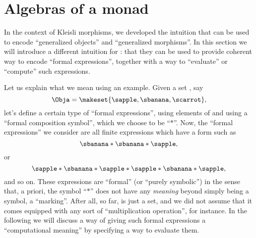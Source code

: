 
\section{Algebras of a monad}
\label{sec:Eilenberg-Moore}



In the context of Kleisli morphisms, we developed the intuition that  can be used to encode ``generalized objects'' and ``generalized morphisms''.
In this section we will introduce a different intuition for : that they can be used to provide coherent way to encode ``formal expressions'', together with a way to ``evaluate'' or ``compute'' such expressions.

Let us explain what we mean using an example.
Given a set \Obja, say
\begin{equation}
    \Obja = \makeset{ \sapple, \sbanana, \scarrot },
\end{equation}
let's define a certain type of ``formal expressions'', using elements of \Obja and using a ``formal composition symbol'', which we choose to be ``$*$''.
Now, the ``formal expressions'' we consider are all finite expressions which have a form such as
\begin{equation}
    \label{eq:formal-composition-1}
    \sbanana * \sbanana * \sapple,
\end{equation}
or
\begin{equation}
    \label{eq:formal-composition-2}
    \sapple * \sbanana * \sapple * \sapple * \sbanana * \sapple,
\end{equation}
and so on.
These expressions are ``formal'' (or ``purely symbolic'') in the sense that, a priori, the symbol ``$*$'' does not have any \emph{meaning} beyond simply being a symbol, a ``marking''.
After all, so far, \Obja is just a set, and we did not assume that it comes equipped with any sort of ``multiplication operation'', for instance.
In the following we will discuss a way of giving such formal expressions a ``computational meaning'' by specifying a way to evaluate them.

